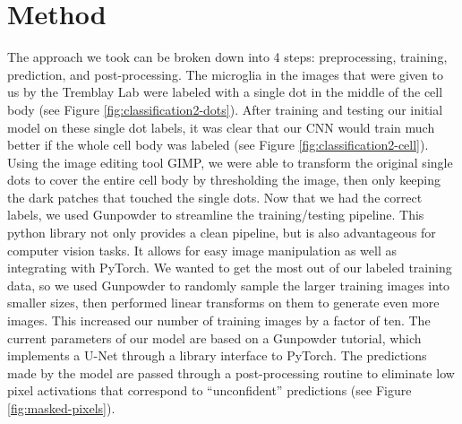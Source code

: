 \documentclass{article}
\begin{document}
\section{Method}

The approach we took can be broken down into 4 steps: preprocessing, training,
prediction, and post-processing. The microglia in the images that were given 
to us by the Tremblay Lab were labeled with a single dot in the middle of the 
cell body (see Figure \ref{fig:classification2-dots}). After training and 
testing our initial model on these single dot labels, it was clear that our 
CNN would train much better if the whole cell body was labeled (see Figure
\ref{fig:classification2-cell}). Using the image editing tool GIMP, we were 
able to transform the original single dots to cover the entire cell body by 
thresholding the image, then only keeping the dark patches that touched the 
single dots. Now that we had the correct labels, we used Gunpowder to 
streamline the training/testing pipeline. This python library not only 
provides a clean pipeline, but is also advantageous for computer vision tasks.
It allows for easy image manipulation as well as integrating with PyTorch. We 
wanted to get the most out of our labeled training data, so we used Gunpowder 
to randomly sample the larger training images into smaller sizes, then 
performed linear transforms on them to generate even more images. This 
increased our number of training images by a factor of ten. The current 
parameters of our model are based on a Gunpowder tutorial, which implements a 
U-Net \parencite{unet} through a library interface to PyTorch. The 
predictions made by the model are passed through a post-processing routine to 
eliminate low pixel activations that correspond to ``unconfident'' predictions 
(see Figure \ref{fig:masked-pixels}). 
\end{document}
